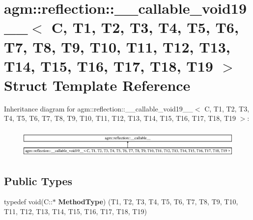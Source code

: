 \hypertarget{structagm_1_1reflection_1_1____callable__void19____}{}\section{agm\+:\+:reflection\+:\+:\+\_\+\+\_\+callable\+\_\+void19\+\_\+\+\_\+$<$ C, T1, T2, T3, T4, T5, T6, T7, T8, T9, T10, T11, T12, T13, T14, T15, T16, T17, T18, T19 $>$ Struct Template Reference}
\label{structagm_1_1reflection_1_1____callable__void19____}
Inheritance diagram for agm\+:\+:reflection\+:\+:\+\_\+\+\_\+callable\+\_\+void19\+\_\+\+\_\+$<$ C, T1, T2, T3, T4, T5, T6, T7, T8, T9, T10, T11, T12, T13, T14, T15, T16, T17, T18, T19 $>$\+:\begin{figure}[H]
\begin{center}
\leavevmode
\includegraphics[height=1.464052cm]{structagm_1_1reflection_1_1____callable__void19____}
\end{center}
\end{figure}
\subsection*{Public Types}
\begin{DoxyCompactItemize}
\item 
typedef void(C\+::$\ast$ {\bfseries Method\+Type}) (T1, T2, T3, T4, T5, T6, T7, T8, T9, T10, T11, T12, T13, T14, T15, T16, T17, T18, T19)\hypertarget{structagm_1_1reflection_1_1____callable__void19_____a76ed559200e89652bcae0554f4bed0c3}{}\label{structagm_1_1reflection_1_1____callable__void19_____a76ed559200e89652bcae0554f4bed0c3}

\end{DoxyCompactItemize}
